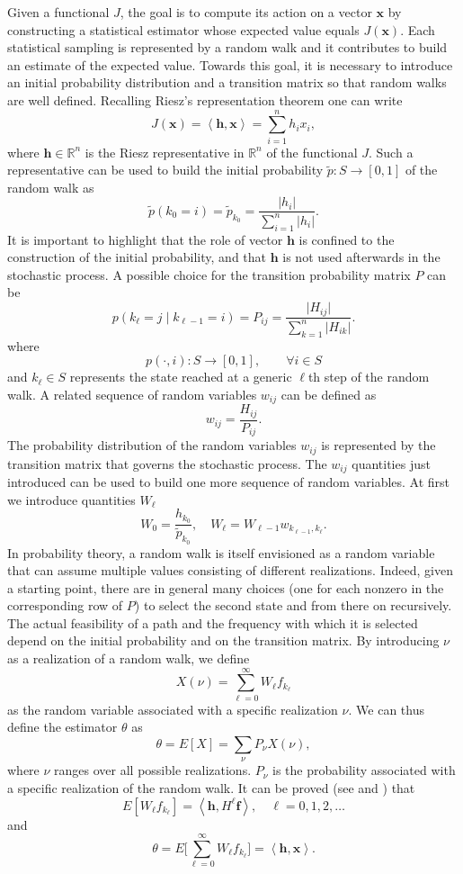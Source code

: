\documentclass[times]{nlaauth}
\begin{document}
 Given a functional $J$, the goal is to compute its action on a vector $\mathbf{x}$ by
 constructing a statistical estimator whose expected value equals $J(\mathbf{x})$. Each statistical sampling
is represented by a random walk and it contributes to build an estimate of the expected value.
Towards this goal, it is necessary to introduce an initial probability distribution
and a transition matrix so that random walks are well defined.
Recalling Riesz's representation theorem one can write
\[
J(\mathbf{x})=\left \langle\mathbf{h},\mathbf{x}\right\rangle=\sum_{i=1}^n h_i
x_i,
\]
where $\mathbf{h}\in \mathbb{R}^n$ is the Riesz representative in
$\mathbb{R}^n$ of the functional $J$.
Such a representative can be used to build the initial probability
$\tilde{p}:
S\rightarrow [0,1]$ of the random walk as
\[
\tilde{p}(k_0=i)=\tilde{p}_{k_0}=\frac{\lvert h_i\rvert}{\sum_{i=1}^n
\lvert h_i\rvert}.
\]
It is important to highlight that the role of vector $\mathbf{h}$ is
confined to the construction of the initial probability, and that $\mathbf{h}$
is not
used afterwards in the stochastic process.
A possible choice for the transition probability matrix $P$ can be
\[
p(k_{\ell}=j \;\lvert\;k_{\ell-1}=i )=P_{ij}=\frac{\lvert
H_{ij}\rvert}{\sum_{k=1}^n
\lvert H_{ik}\rvert}.
\]
where
\[
p(\cdot,i):S\rightarrow [0,1], \qquad \forall i\in S
\]
and $k_{\ell}\in S$
represents the state reached at a generic $\ell$th step of the random walk.
A related sequence of random variables $w_{ij}$ can be defined
as
\[
w_{ij}=\frac{H_{ij}}{P_{ij}}.
\]
The probability distribution of the random variables $w_{ij}$ is represented
by the transition matrix that governs the stochastic process. The $w_{ij}$
quantities just introduced can be used to build one more sequence
of random variables.
At first we introduce quantities $W_\ell$
\[
W_{0}=\frac{h_{k_0}}{\tilde{p}_{k_0}}, \quad W_{\ell}=W_{\ell-1}
w_{k_{\ell-1},k_{\ell}}.
\]
In probability theory, a random walk is itself envisioned as a random variable that can assume multiple
values consisting of different realizations. Indeed, given a starting point, there are in general many choices
(one for each nonzero in the corresponding row of $P$) to select the second state and from there on recursively.
The actual feasibility of a path and the frequency with which it is selected depend on the initial probability and on
the transition matrix.
By introducing $\nu$ as a realization
of a random walk, we define
\[
X(\nu)=\sum_{\ell=0}^\infty W_{\ell} f_{k_{\ell}}
\]
as the random variable associated with a specific realization $\nu$.
We can thus
define the estimator $\theta$ as
\[
\theta=E[X]=\sum_{\nu}P_{\nu}X(\nu),
\]
where $\nu$ ranges over all possible realizations.
$P_{\nu}$ is the probability associated with a specific realization of the
random walk.
It can be proved (see \cite{Hal1962} and \cite{Hal1994}) that
\[
E[W_{\ell}
f_{k_{\ell}}]=\left\langle\mathbf{h},H^{\ell}\mathbf{f}\right\rangle, \quad
\ell=0,1,2,\ldots
\]
and
\[
\theta=E\bigg[\sum_{\ell=0}^\infty W_{\ell}
f_{k_{\ell}}\bigg]=\left\langle\mathbf{h},\mathbf{x}\right\rangle.
\]
\end{document}
